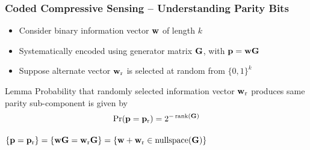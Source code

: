 \begin{frame}
\frametitle{Coded Compressive Sensing -- Understanding Parity Bits}
\begin{center}

\end{center}
\begin{itemize}
\item Consider binary information vector $\mathbf{w}$ of length $k$
\item Systematically encoded using generator matrix $\mathbf{G}$, with
$\mathbf{p} = \mathbf{w} \mathbf{G}$
\item Suppose alternate vector $\mathbf{w}_{\mathrm{r}}$ is selected at random from $\{ 0, 1 \}^k$
\end{itemize}
\vfill
\begin{block}{Lemma}
Probability that randomly selected information vector $\mathbf{w}_{\mathrm{r}}$ produces same parity sub-component is given by
\begin{equation*}
\Pr (\mathbf{p} = \mathbf{p}_{\mathrm{r}}) = {2^{-\operatorname{rank}(\mathbf{G})}}
\end{equation*}
\end{block}
$\{ \mathbf{p} = \mathbf{p}_{\mathrm{r}} \}
= \{ \mathbf{w} \mathbf{G} = \mathbf{w}_{\mathrm{r}} \mathbf{G} \}
= \{ \mathbf{w} + \mathbf{w}_{\mathrm{r}} \in \operatorname{nullspace}(\mathbf{G}) \}$
\end{frame}


